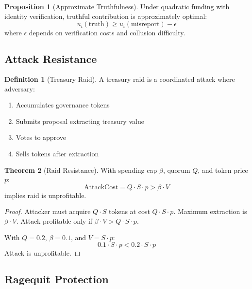 \documentclass[11pt,a4paper]{article}
\theoremstyle{definition}
\newtheorem{definition}{Definition}[section]
\newtheorem{theorem}{Theorem}[section]
\newtheorem{proposition}[theorem]{Proposition}
\theoremstyle{remark}
\begin{document}
\begin{proposition}[Approximate Truthfulness]
Under quadratic funding with identity verification, truthful contribution is approximately optimal:
\begin{equation}
    u_i(\text{truth}) \geq u_i(\text{misreport}) - \epsilon
\end{equation}
where $\epsilon$ depends on verification costs and collusion difficulty.
\end{proposition}

\subsection{Attack Resistance}

\begin{definition}[Treasury Raid]
A treasury raid is a coordinated attack where adversary:
\begin{enumerate}
    \item Accumulates governance tokens
    \item Submits proposal extracting treasury value
    \item Votes to approve
    \item Sells tokens after extraction
\end{enumerate}
\end{definition}

\begin{theorem}[Raid Resistance]
With spending cap $\beta$, quorum $Q$, and token price $p$:
\begin{equation}
    \text{AttackCost} = Q \cdot S \cdot p > \beta \cdot V
\end{equation}
implies raid is unprofitable.
\end{theorem}

\begin{proof}
Attacker must acquire $Q \cdot S$ tokens at cost $Q \cdot S \cdot p$.
Maximum extraction is $\beta \cdot V$.
Attack profitable only if $\beta \cdot V > Q \cdot S \cdot p$.

With $Q = 0.2$, $\beta = 0.1$, and $V = S \cdot p$:
\begin{equation}
    0.1 \cdot S \cdot p < 0.2 \cdot S \cdot p
\end{equation}
Attack is unprofitable.
\end{proof}

\subsection{Ragequit Protection}
\end{document}
